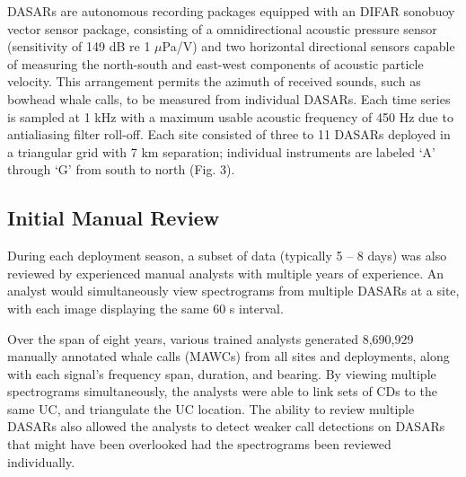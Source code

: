 \documentclass[preprint,NumberedRefs]{JASAnew}
\begin{document}
DASARs are autonomous recording packages equipped with an DIFAR sonobuoy vector sensor package\cite{holler2014evolution,Kuzu6459697_DIFAR}, consisting of a omnidirectional acoustic pressure sensor (sensitivity of 149 dB re 1 $\mu$Pa/V) and two horizontal directional sensors capable of measuring the north-south and east-west components of acoustic particle velocity\cite{greene2004directional}.  This arrangement permits the azimuth of received sounds, such as bowhead whale calls, to be measured from individual DASARs.  Each time series is sampled at 1 kHz with a maximum usable acoustic frequency of 450 Hz due to antialiasing filter roll-off.  
Each site consisted of three to 11 DASARs deployed in a triangular grid with 7 km separation; individual instruments are labeled ‘A’ through ‘G’ from south to north (Fig. 3).  


\subsection{Initial Manual Review}

During each deployment season,  a subset of data (typically 5 – 8 days) was also reviewed by experienced manual analysts with multiple years of experience. An analyst would simultaneously view spectrograms from multiple DASARs at a site, with each image displaying the same 60 s interval. 

Over the span of eight years, various trained analysts generated 8,690,929 manually annotated whale calls (MAWCs) from all sites and deployments, along with each signal's frequency span, duration, and bearing.  By viewing multiple spectrograms simultaneously, the analysts were able to link sets of CDs to the same UC, and triangulate the UC location.  The ability to review multiple DASARs also allowed the analysts to detect weaker call detections on DASARs that might have been overlooked had the spectrograms been reviewed individually.  
\end{document}
